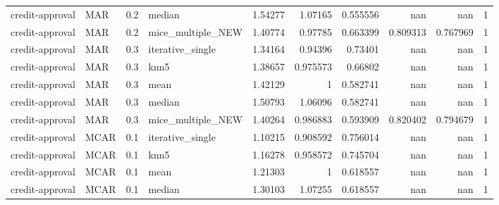 \begin{table}[ht]
\begin{tabular}{llrlrrrrrr}
 credit-approval & MAR         &         0.2 & median            &       1.54277  &             1.07165  &              0.555556  &                       nan        &                    nan         &         1 \\
 credit-approval & MAR         &         0.2 & mice\_multiple\_NEW &       1.40774  &             0.97785  &              0.663399  &                         0.809313 &                      0.767969  &         1 \\
 credit-approval & MAR         &         0.3 & iterative\_single  &       1.34164  &             0.94396  &              0.73401   &                       nan        &                    nan         &         1 \\
 credit-approval & MAR         &         0.3 & knn5              &       1.38657  &             0.975573 &              0.66802   &                       nan        &                    nan         &         1 \\
 credit-approval & MAR         &         0.3 & mean              &       1.42129  &             1        &              0.582741  &                       nan        &                    nan         &         1 \\
 credit-approval & MAR         &         0.3 & median            &       1.50793  &             1.06096  &              0.582741  &                       nan        &                    nan         &         1 \\
 credit-approval & MAR         &         0.3 & mice\_multiple\_NEW &       1.40264  &             0.986883 &              0.593909  &                         0.820402 &                      0.794679  &         1 \\
 credit-approval & MCAR        &         0.1 & iterative\_single  &       1.10215  &             0.908592 &              0.756014  &                       nan        &                    nan         &         1 \\
 credit-approval & MCAR        &         0.1 & knn5              &       1.16278  &             0.958572 &              0.745704  &                       nan        &                    nan         &         1 \\
 credit-approval & MCAR        &         0.1 & mean              &       1.21303  &             1        &              0.618557  &                       nan        &                    nan         &         1 \\
 credit-approval & MCAR        &         0.1 & median            &       1.30103  &             1.07255  &              0.618557  &                       nan        &                    nan         &         1 \\

\end{tabular}
\end{table}
